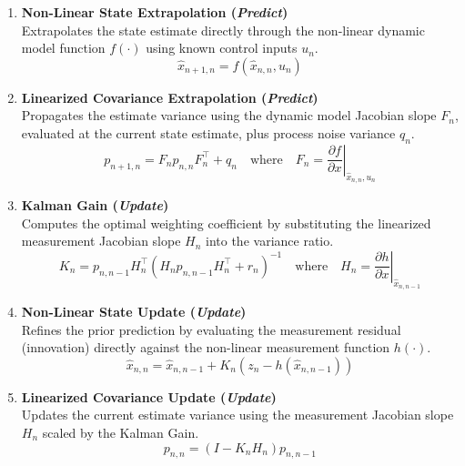 \begin{enumerate}[label=\textbf{Step \arabic*:}, leftmargin=*, itemsep=1em]
	
	\item \textbf{Non-Linear State Extrapolation (\emph{Predict})}\\
	Extrapolates the state estimate directly through the non-linear dynamic model function $f(\cdot)$ using known control inputs $u_n$.
	\begin{equation}
		\hat{x}_{n+1,n} = f\left(\hat{x}_{n,n}, u_n\right)
	\end{equation}
	
	\item \textbf{Linearized Covariance Extrapolation (\emph{Predict})}\\
	Propagates the estimate variance using the dynamic model Jacobian slope $F_n$, evaluated at the current state estimate, plus process noise variance $q_n$.
	\begin{equation}
		p_{n+1,n} = F_n p_{n,n} F_n^\top + q_n \quad \text{where} \quad F_n = \left. \frac{\partial f}{\partial x} \right|_{\hat{x}_{n,n}, u_n}
	\end{equation}
	
	\item \textbf{Kalman Gain (\emph{Update})}\\
	Computes the optimal weighting coefficient by substituting the linearized measurement Jacobian slope $H_n$ into the variance ratio.
	\begin{equation}
		K_n = p_{n,n-1} H_n^\top \left(H_n p_{n,n-1} H_n^\top + r_n\right)^{-1} \quad \text{where} \quad H_n = \left. \frac{\partial h}{\partial x} \right|_{\hat{x}_{n,n-1}}
	\end{equation}
	
	\item \textbf{Non-Linear State Update (\emph{Update})}\\
	Refines the prior prediction by evaluating the measurement residual (innovation) directly against the non-linear measurement function $h(\cdot)$.
	\begin{equation}
		\hat{x}_{n,n} = \hat{x}_{n,n-1} + K_n\left(z_n - h\left(\hat{x}_{n,n-1}\right)\right)
	\end{equation}
	
	\item \textbf{Linearized Covariance Update (\emph{Update})}\\
	Updates the current estimate variance using the measurement Jacobian slope $H_n$ scaled by the Kalman Gain.
	\begin{equation}
		p_{n,n} = \left(I - K_n H_n\right) p_{n,n-1}
	\end{equation}
	
\end{enumerate}

